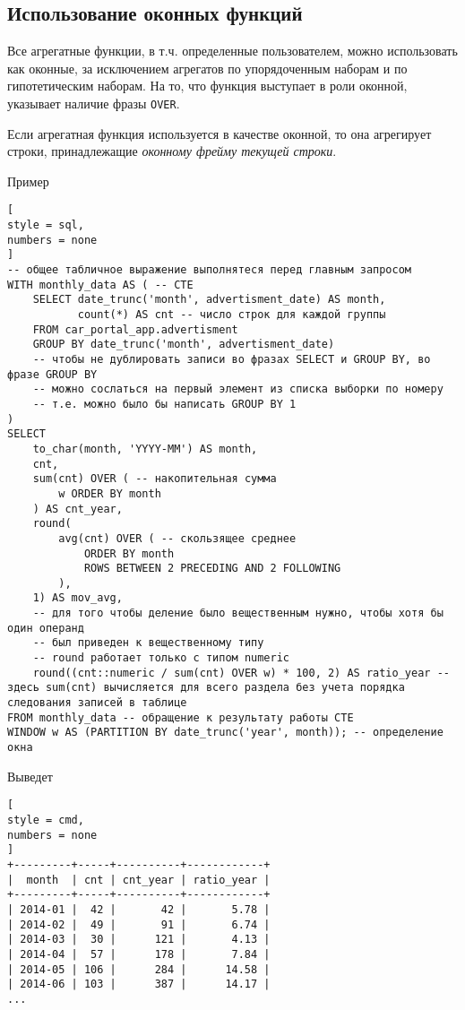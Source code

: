 \documentclass[%
	11pt,
	a4paper,
	utf8,
		]{article}
\begin{document}
\subsection{Использование оконных функций}

Все агрегатные функции, в т.ч. определенные пользователем, можно использовать как оконные, за исключением агрегатов по упорядоченным наборам и по гипотетическим наборам. На то, что функция выступает в роли оконной, указывает наличие фразы \texttt{OVER}.

Если агрегатная функция используется в качестве оконной, то она агрегирует строки, принадлежащие \emph{оконному фрейму текущей строки}.

Пример
\begin{lstlisting}[
style = sql,
numbers = none
]
-- общее табличное выражение выполнятеся перед главным запросом
WITH monthly_data AS ( -- CTE
    SELECT date_trunc('month', advertisment_date) AS month,
           count(*) AS cnt -- число строк для каждой группы
    FROM car_portal_app.advertisment
    GROUP BY date_trunc('month', advertisment_date)
    -- чтобы не дублировать записи во фразах SELECT и GROUP BY, во фразе GROUP BY
    -- можно сослаться на первый элемент из списка выборки по номеру
    -- т.е. можно было бы написать GROUP BY 1
)
SELECT
    to_char(month, 'YYYY-MM') AS month,
    cnt,
    sum(cnt) OVER ( -- накопительная сумма
        w ORDER BY month
    ) AS cnt_year, 
    round(
        avg(cnt) OVER ( -- скользящее среднее
            ORDER BY month
            ROWS BETWEEN 2 PRECEDING AND 2 FOLLOWING
        ),
    1) AS mov_avg,
    -- для того чтобы деление было вещественным нужно, чтобы хотя бы один операнд
    -- был приведен к вещественному типу
    -- round работает только с типом numeric
    round((cnt::numeric / sum(cnt) OVER w) * 100, 2) AS ratio_year -- здесь sum(cnt) вычисляется для всего раздела без учета порядка следования записей в таблице
FROM monthly_data -- обращение к результату работы CTE
WINDOW w AS (PARTITION BY date_trunc('year', month)); -- определение окна
\end{lstlisting}

Выведет
\begin{lstlisting}[
style = cmd,
numbers = none
]
+---------+-----+----------+------------+
|  month  | cnt | cnt_year | ratio_year |
+---------+-----+----------+------------+
| 2014-01 |  42 |       42 |       5.78 |
| 2014-02 |  49 |       91 |       6.74 |
| 2014-03 |  30 |      121 |       4.13 |
| 2014-04 |  57 |      178 |       7.84 |
| 2014-05 | 106 |      284 |      14.58 |
| 2014-06 | 103 |      387 |      14.17 |
...
\end{lstlisting}
\end{document}
